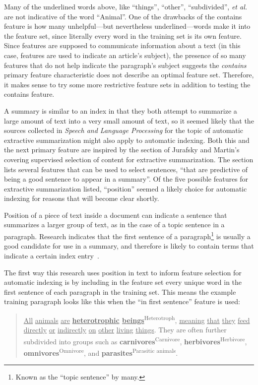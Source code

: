 Many of the underlined words above, like ``things'', ``other'', ``subdivided'', {\it et al.} are not indicative of the word ``Animal''.
One of the drawbacks of the contains feature is how many unhelpful---but nevertheless underlined---words make it into the feature set, since literally every word in the training set is its own feature.
Since features are supposed to communicate information about a text (in this case, features are used to indicate an article's subject), the presence of so many features that do not help indicate the paragraph's subject suggests the {\it contains} primary feature characteristic does not describe an optimal feature set.
Therefore, it makes sense to try some more restrictive feature sets in addition to testing the contains feature.


A summary is similar to an index in that they both attempt to summarize a large amount of text into a very small amount of text, so it seemed likely that the sources collected in {\it Speech and Language Processing} for the topic of automatic extractive summarization might also apply to automatic indexing.
Both this and the next primary feature are inspired by the section of Jurafsky and Martin's covering supervised selection of content for extractive summarization.
The section lists several features that can be used to select sentences, ``that are predictive of being a good sentence to appear in a summary''.
Of the five possible features for extractive summarization listed, ``position'' seemed a likely choice for automatic indexing for reasons that will become clear shortly.

Position of a piece of text inside a document can indicate a sentence that summarizes a larger group of text, as in the case of a topic sentence in a paragraph.
Research indicates that the first sentence of a paragraph\footnote{Known as the ``topic sentence'' by many.} is usually a good candidate for use in a summary, and therefore is likely to contain terms that indicate a certain index entry~\cite{jurafsky}.

The first way this research uses position in text to inform feature selection for automatic indexing is by including in the feature set every unique word in the first sentence of each paragraph in the training set.
This means the example training paragraph looks like this when the ``in first sentence'' feature is used:

\begin{quote}
\underline{All} \underline{animals} \underline{are} {\bf \underline{heterotrophic} \underline{beings}}\textsuperscript{Heterotroph}, \underline{meaning} \underline{that} \underline{they} \underline{feed} \underline{directly} \underline{or} \underline{indirectly} \underline{on} \underline{other} \underline{living} \underline{things}. They are often further subdivided into groups such as {\bf carnivores}\textsuperscript{Carnivore}, {\bf herbivores}\textsuperscript{Herbivore}, {\bf omnivores}\textsuperscript{Omnivore}, and {\bf parasites}\textsuperscript{Parasitic animals}.
\end{quote} 

